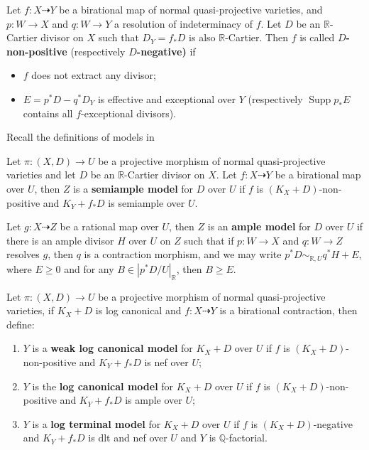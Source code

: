 \begin{defn}\label{negativemap}
	\cite[Definition 3.6.1]{BCHM10} Let $f:X\dashrightarrow Y$ be a birational map of normal quasi-projective varieties, and $p:W\to X$ and $q:W\to Y$  a resolution of indeterminacy of $f$. Let $D$ be an $\mathbb{R}$-Cartier divisor on $X$ such that  $D_{Y}=f_*D$ is  also $\mathbb{R}$-Cartier. Then $f$ is called \textbf{$D$-non-positive} (respectively \textbf{$D$-negative)} if
	\begin{itemize}
		\item $f$ does not extract any divisor;
		\item $E=p^{*}D-q^*D_Y$ is effective and exceptional over $Y$ (respectively $\operatorname{Supp}p_*E$ contains all $f$-exceptional divisors).
	\end{itemize}
\end{defn}

Recall the definitions of models in \cite{BCHM10}
\begin{defn}
	\cite[Definition 3.6.5]{BCHM10} Let $ \pi:(X,D)\to U $ be a projective morphism of normal quasi-projective varieties and let $D$ be an $\mathbb{R}$-Cartier divisor on $X$. Let $ f: X\dashrightarrow Y $ be a birational map over $ U $, then $ Z $ is a \textbf{semiample model } for $ D $ over $ U $ if $ f $ is $ (K_X+D) $-non-positive and $ K_Y+f_*D $ is semiample over $ U $.

	Let $ g:X\dashrightarrow Z $ be a rational map over $ U $, then $ Z $ is an \textbf{ample model } for $ D $ over $ U $ if there is  an ample divisor $H$  over $U$  on $Z$  such that if $p:W \to X $ and $q:W \to Z $ resolves $g$, then $q$ is a contraction morphism, and we may write $p^*D \sim_{\mathbb{R},U} q^*H+E$, where $E\geqslant 0$ and for any $B \in |p^*D/U|_{\mathbb{R}}$, then $B\geqslant E$.
\end{defn}
\begin{defn}\label{models}
	\cite[Definition 3.6.7]{BCHM10} Let $ \pi:(X,D)\to U $ be a projective morphism of normal quasi-projective varieties, if $ K_X+D $ is log canonical and $ f:X\dashrightarrow Y $ is a birational contraction, then define:
	\begin{enumerate}
		\item $ Y $ is a \textbf{weak log canonical model} for $ K_X+D $ over $ U $ if $ f $ is $ (K_X+D) $-non-positive and $ K_Y+f_*D $ is nef over $ U $;
		\item $ Y $ is the \textbf{log canonical model} for $ K_X+D $ over $ U $ if $ f $ is $ (K_X+D) $-non-positive and $ K_Y+f_*D $ is ample over $ U $;
		\item $ Y $ is  a \textbf{log terminal model} for $ K_X+D $ over $ U $ if $ f $ is $ (K_X+D)$-negative and $ K_Y+f_*D $ is dlt and nef over $ U $ and $ Y $ is $ \mathbb{Q} $-factorial.
	\end{enumerate}
\end{defn}

